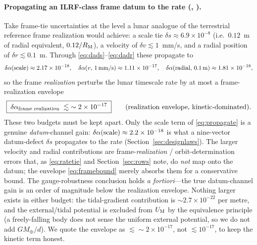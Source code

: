 \paragraph{Propagating an ILRF-class frame datum to the rate (\Modelled{}, \modtag{}).}
Take frame-tie uncertainties at the level a lunar analogue of the terrestrial reference
frame realization would achieve: a scale tie $\delta s\approx6.9\times10^{-8}$
(i.e.\ $0.12$~m of radial equivalent, $0.12/R_{\mathrm{M}}$), a velocity of
$\delta v\lesssim1$~mm/s, and a radial position of $\delta r\lesssim0.1$~m. Through
\eqref{eq:dads}--\eqref{eq:dadr} these propagate to
\begin{equation}
  \delta\alpha(\text{scale})\approx2.17\times10^{-18},\quad
  \delta\alpha(v,\,1\,\text{mm/s})\approx1.11\times10^{-17},\quad
  \delta\alpha(\text{radial},\,0.1\,\text{m})\approx1.81\times10^{-18},
  \label{eq:propagate}
\end{equation}
so the frame \emph{realization} perturbs the lunar timescale rate by at most a
frame-realization envelope
\begin{equation}
  \boxed{\;\delta\alpha_{\text{frame realization}}\;\lesssim\;\sim2\times10^{-17}\;}
  \qquad\text{(realization envelope, kinetic-dominated).}
  \label{eq:framebound}
\end{equation}
These two budgets must be kept apart. Only the scale term of \eqref{eq:propagate} is a
genuine \emph{datum}-channel gain: $\delta\alpha(\text{scale})\approx2.2\times10^{-18}$ is what a
nine-vector datum-defect $\delta s$ propagates to the rate (Section~\ref{sec:designlaws}).
The larger velocity and radial contributions are frame-\emph{realization} /
orbit-determination errors that, as \eqref{eq:ratetie} and Section~\ref{sec:rows} note, do
\emph{not} map onto the datum; the envelope \eqref{eq:framebound} merely absorbs them for a
conservative bound. The gauge-robustness conclusion holds \emph{a fortiori}---the true
datum-channel gain is an order of magnitude below the realization envelope. Nothing larger
exists in either budget: the tidal-gradient contribution is $\sim2.7\times10^{-22}$ per
metre, and the external/tidal potential is excluded from $U_{\mathrm{M}}$ by the equivalence
principle (a freely-falling body does not sense the uniform external potential, so we do not
add $GM_{\oplus}/d$). We quote the envelope as $\lesssim\!\sim\!2\times10^{-17}$, not
$\lesssim10^{-17}$, to keep the kinetic term honest.

